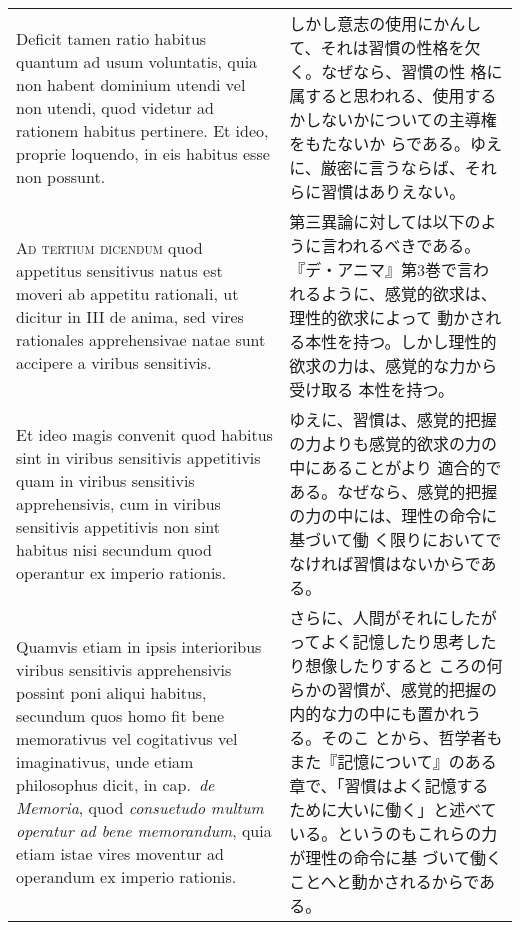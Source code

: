 \documentclass[10pt]{jsarticle} %
\begin{document}
\begin{longtable}{p{21em}p{21em}}
\\

Deficit tamen ratio habitus quantum ad usum voluntatis, quia non
habent dominium utendi vel non utendi, quod videtur ad rationem
habitus pertinere. Et ideo, proprie loquendo, in eis habitus esse non
possunt.

&

しかし意志の使用にかんして、それは習慣の性格を欠く。なぜなら、習慣の性
 格に属すると思われる、使用するかしないかについての主導権をもたないか
 らである。ゆえに、厳密に言うならば、それらに習慣はありえない。

\\



{\scshape Ad tertium dicendum} quod appetitus sensitivus natus est moveri ab
 appetitu rationali, ut dicitur in III de anima, sed vires rationales
 apprehensivae natae sunt accipere a viribus sensitivis. 


&

第三異論に対しては以下のように言われるべきである。
『デ・アニマ』第3巻で言われるように、感覚的欲求は、理性的欲求によって
 動かされる本性を持つ。しかし理性的欲求の力は、感覚的な力から受け取る
 本性を持つ。

\\

Et ideo magis
 convenit quod habitus sint in viribus sensitivis appetitivis quam in
 viribus sensitivis apprehensivis, cum in viribus sensitivis
 appetitivis non sint habitus nisi secundum quod operantur ex imperio
 rationis. 


&

ゆえに、習慣は、感覚的把握の力よりも感覚的欲求の力の中にあることがより
適合的である。なぜなら、感覚的把握の力の中には、理性の命令に基づいて働
く限りにおいてでなければ習慣はないからである。

\\

Quamvis etiam in ipsis interioribus viribus sensitivis apprehensivis
possint poni aliqui habitus, secundum quos homo fit bene memorativus
vel cogitativus vel imaginativus, unde etiam philosophus dicit, in
cap.~{\itshape de Memoria}, quod {\itshape consuetudo multum operatur
ad bene memorandum}, quia etiam istae vires moventur ad operandum ex
imperio rationis.



&

さらに、人間がそれにしたがってよく記憶したり思考したり想像したりすると
 ころの何らかの習慣が、感覚的把握の内的な力の中にも置かれうる。そのこ
 とから、哲学者もまた『記憶について』のある章で、「習慣はよく記憶する
 ために大いに働く」と述べている。というのもこれらの力が理性の命令に基
 づいて働くことへと動かされるからである。


\end{longtable}
\end{document}
